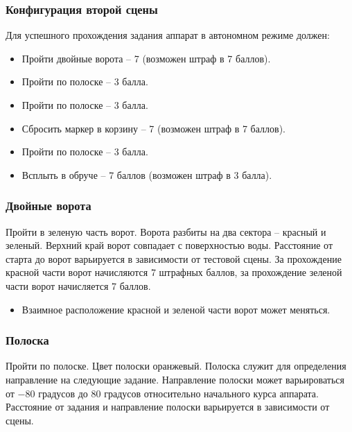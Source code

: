 
\subsubsection*{Конфигурация второй сцены}


Для успешного прохождения задания аппарат в автономном режиме должен:

\begin{itemize}
    \item Пройти двойные ворота – 7 (возможен штраф в 7 баллов).
    \item Пройти по полоске – 3 балла.
    \item Пройти по полоске – 3 балла.
    \item Сбросить маркер в корзину – 7  (возможен штраф в 7 баллов).
    \item Пройти по полоске – 3 балла.
    \item Всплыть в обруче – 7 баллов (возможен штраф в 3 балла).
\end{itemize}

\subsubsection*{Двойные ворота}


Пройти в зеленую часть ворот. Ворота разбиты на два сектора – красный и зеленый. Верхний край ворот совпадает с поверхностью воды. Расстояние от старта до ворот варьируется в зависимости от тестовой сцены. За прохождение красной части ворот начисляются 7 штрафных баллов, за прохождение зеленой части ворот начисляется 7 баллов.

\begin{itemize}
    \item Взаимное расположение красной и зеленой части ворот может меняться. 
\end{itemize}

\subsubsection*{Полоска}


Пройти по полоске. Цвет полоски оранжевый. Полоска служит для определения направление на следующие задание. Направление полоски может варьироваться от   $-80$ градусов до $80$ градусов относительно начального курса аппарата. Расстояние от задания и направление полоски варьируется в зависимости от сцены.

